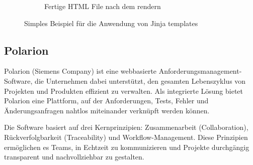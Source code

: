 \documentclass[a4paper, 12pt]{article}
\begin{document}
\begin{figure}[H]
\begin{subfigure}{0.6\textwidth}
        \caption{Fertige HTML File nach dem rendern}
        \label{fig:jinja_fertige_html_file}
    \end{subfigure}

    \caption{Simples Beispiel für die Anwendung von Jinja templates}
    \label{fig:jinja_example}
\end{figure}

\subsection{Polarion}\label{polarion}
Polarion (Siemens Company) ist eine webbasierte Anforderungsmanagement-Software, die Unternehmen dabei unterstützt, den gesamten Lebenszyklus von Projekten und Produkten effizient zu verwalten. Als integrierte Lösung bietet Polarion eine Plattform, auf der Anforderungen, Tests, Fehler und Änderungsanfragen nahtlos miteinander verknüpft werden können.

Die Software basiert auf drei Kernprinzipien: Zusammenarbeit (Collaboration), Rückverfolgbarkeit (Traceability) und Workflow-Management. Diese Prinzipien ermöglichen es Teams, in Echtzeit zu kommunizieren und Projekte durchgängig transparent und nachvollziehbar zu gestalten.
\end{document}
